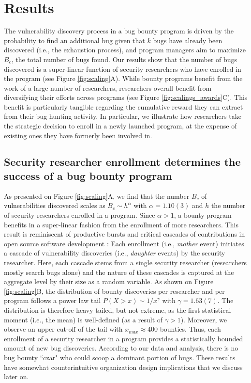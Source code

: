 \section{Results}
\label{sec:results}
The vulnerability discovery process in a bug bounty program is driven by the probability to find an additional bug given that $k$ bugs have already been discovered (i.e., the exhaustion process), and program managers aim to maximize $B_c$, the total number of bugs found. Our results show that the number of bugs discovered is a super-linear function of security researchers who have enrolled in the program (see Figure \ref{fig:scaling}A). While bounty programs benefit from the work of a large number of researchers, researchers overall benefit from diversifying their efforts across programs (see Figure \ref{fig:scalings_awards}C). This benefit is particularly tangible regarding the cumulative reward they can extract from their bug hunting activity. In particular, we illustrate how researchers take the strategic decision to enroll in a newly launched program, at the expense of existing ones they have formerly been involved in.
 
\subsection{Security researcher enrollment determines the success of a bug bounty program}
As presented on Figure \ref{fig:scaling}A, we find that the number $B_c$ of vulnerabilities discovered scales as $B_c \sim h^{\alpha}$ with $\alpha = 1.10(3)$ and $h$ the number of security researchers enrolled in a program. Since $\alpha > 1$, a bounty program benefits in a super-linear fashion from the enrollment of more researchers. This result is reminiscent of productive bursts and critical cascades of contributions in open source software development \cite{sornette2014much}: Each enrollment (i.e., {\it mother} event) initiates a cascade of vulnerability discoveries (i.e., {\it daughter} events) by the security researcher. Here, each cascade stems from a single security researcher (researchers mostly search bugs alone) and the nature of these cascades is captured at the aggregate level by their size as a random variable. As shown on Figure \ref{fig:scaling}B, the distribution of bounty discoveries per researcher and per program follows a power law tail $P(X>x) \sim 1/x^\gamma$  with $ \gamma = 1.63(7)$. The distribution is therefore heavy-tailed, but not extreme, as the first statistical moment (i.e., the mean) is well-defined (as a result of $ \gamma > 1$). Moreover, we observe an upper cut-off of the tail with $x_{max} \approx 400$ bounties. Thus, each enrollment of a security researcher in a program provides a statistically bounded amount of new bug discoveries. According to our data and analysis, there is no bug bounty ``czar" who could scoop a dominant portion of bugs. These results have somewhat counterintuitive organization design implications that we discuss later on.\\

